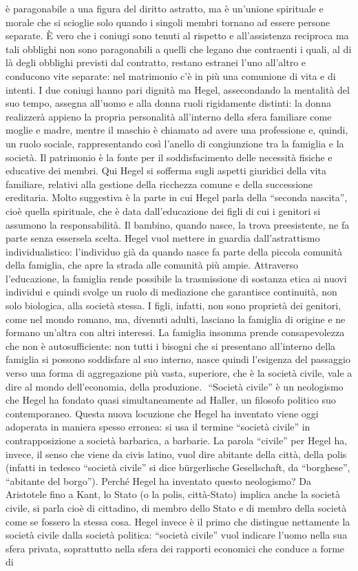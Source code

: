 \documentclass[a4paper,12pt,oneside,openany]{book}%
\begin{document}
è paragonabile a una figura del diritto astratto, ma è un’unione spirituale e morale che si scioglie solo quando i singoli membri tornano ad essere persone separate. È vero che i coniugi sono tenuti al rispetto e all’assistenza reciproca ma tali obblighi non sono paragonabili a quelli che legano due contraenti i quali, al di là degli obblighi previsti dal contratto, restano estranei l’uno all’altro e conducono vite separate: nel matrimonio c’è in più una comunione di vita e di intenti. I due coniugi hanno pari dignità ma Hegel, assecondando la mentalità del suo tempo, assegna all’uomo e alla donna ruoli rigidamente distinti: la donna realizzerà appieno la propria personalità all’interno della sfera familiare come moglie e madre, mentre il maschio è chiamato ad avere una professione e, quindi, un ruolo sociale, rappresentando così l’anello di congiunzione tra la famiglia e la società. Il patrimonio è la fonte per il soddisfacimento delle necessità fisiche e educative dei membri. Qui Hegel si sofferma sugli aspetti giuridici della vita familiare, relativi alla gestione della ricchezza comune e della successione ereditaria. Molto suggestiva è la parte in cui Hegel parla della “seconda nascita”, cioè quella spirituale, che è data dall’educazione dei figli di cui i genitori si assumono la responsabilità. Il bambino, quando nasce, la trova preesistente, ne fa parte senza essersela scelta. Hegel vuol mettere in guardia dall’astrattismo individualistico: l’individuo già da quando nasce fa parte della piccola comunità della famiglia, che apre la strada alle comunità più ampie. Attraverso l’educazione, la famiglia rende possibile la trasmissione di sostanza etica ai nuovi individui e quindi svolge un ruolo di mediazione che garantisce continuità, non solo biologica, alla società stessa. I figli, infatti, non sono proprietà dei genitori, come nel mondo romano, ma, divenuti adulti, lasciano la famiglia di origine e ne formano un’altra con altri interessi. La famiglia insomma prende consapevolezza che non è autosufficiente: non tutti i bisogni che si presentano all’interno della famiglia si possono soddisfare al suo interno, nasce quindi l’esigenza del passaggio verso una forma di aggregazione più vasta, superiore, che è la società civile, vale a dire al mondo dell’economia, della produzione.  “Società civile” è un neologismo che Hegel ha fondato quasi simultaneamente ad Haller, un filosofo politico suo contemporaneo. Questa nuova locuzione che Hegel ha inventato viene oggi adoperata in maniera spesso erronea: si usa il termine “società civile” in contrapposizione a società barbarica, a barbarie. La parola “civile” per Hegel ha, invece, il senso che viene da civis latino, vuol dire abitante della città, della polis (infatti in tedesco “società civile” si dice bürgerlische Gesellschaft, da “borghese”, “abitante del borgo”). Perché Hegel ha inventato questo neologismo? Da Aristotele fino a Kant, lo Stato (o la polis, città-Stato) implica anche la società civile, si parla cioè di cittadino, di membro dello Stato e di membro della società come se fossero la stessa cosa. Hegel invece è il primo che distingue nettamente la società civile dalla società politica: “società civile” vuol indicare l’uomo nella sua sfera privata, soprattutto nella sfera dei rapporti economici che conduce a forme di 
\end{document}
